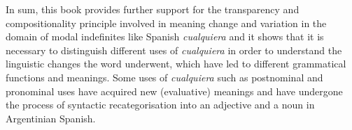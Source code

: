 In sum, this book provides further support for the transparency and compositionality principle involved in meaning change and variation in the domain of modal indefinites like Spanish \textit{cualquiera} and it shows that {it is necessary to distinguish different uses of \textit{cualquiera} in order to understand the linguistic changes the word underwent, which have led to different grammatical functions and meanings. Some uses of \textit{cualquiera} such as postnominal and pronominal uses have acquired new (evaluative) meanings and have undergone the process of syntactic recategorisation into an adjective and a noun in Argentinian Spanish.}

